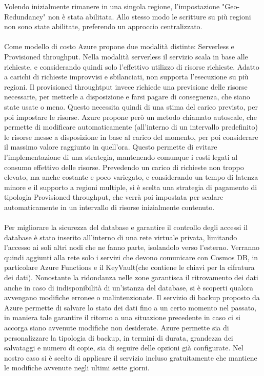 Volendo inizialmente rimanere in una singola regione,
l'impostazione "Geo-Redundancy" non è stata abilitata.
Allo stesso modo le scritture su più regioni non sono state abilitate,
preferendo un approccio centralizzato.\\
\\
Come modello di costo Azure propone due modalità distinte: Serverless e Provisioned throughput.
Nella modalità serverless il servizio scala in base alle richieste,
e considerando quindi solo l'effettivo utilizzo di risorse richieste.
Adatto a carichi di richieste improvvisi e sbilanciati,
non supporta l'esecuzione su più regioni.
Il provisioned throughtput invece richiede una previsione delle risorse necessarie,
per metterle a disposizione e farsi pagare di conseguenza, che siano state usate o meno.
Questo necessita quindi di una stima del carico previsto,
per poi impostare le risorse.
Azure propone però un metodo chiamato autoscale, 
che permette di modificare automaticamente (all'interno di un intervallo predefinito)
le risorse messe a disposizione in base al carico del momento,
per poi considerare il massimo valore raggiunto in quell'ora.
Questo permette di evitare l'implementazione di una strategia,
mantenendo comunque i costi legati al consumo effettivo delle risorse.
Prevedendo un carico di richieste non troppo elevato,
ma anche costante e poco variegato, 
e considerando un tempo di latenza minore e il supporto a regioni multiple,
si è scelta una strategia di pagamento di tipologia Provisioned throughput,
che verrà poi impostata per scalare automaticamente in un intervallo di risorse inizialmente contenuto.\\
\\
Per migliorare la sicurezza del database e garantire il controllo degli accessi
il database è stato inserito all'interno di una rete virtuale privata,
limitando l'accesso ai soli altri nodi che ne fanno parte,
isolandolo verso l'esterno.
Verranno quindi aggiunti alla rete solo i servizi che devono comunicare con Cosmos DB,
in particolare Azure Functions e il KeyVault(che contiene le chiavi per la cifratura dei dati).
Nonostante la ridondanza nelle zone garantisca il ritrovamento dei dati 
anche in caso di indisponibilità di un'istanza del database,
si è scoperti qualora avvengano modifiche erronee o malintenzionate.
Il servizio di backup proposto da Azure permette di salvare lo stato dei dati 
fino a un certo momento nel passato, 
in maniera tale garantire il ritorno a una situazione precedente 
in caso ci si accorga siano avvenute modifiche non desiderate. 
Azure permette sia di personalizzare la tipologia di backup,
in termini di durata, grandezza dei salvataggi e numero di copie,
sia di seguire delle opzioni già configurate.
Nel nostro caso si è scelto di applicare il servizio incluso gratuitamente
che mantiene le modifiche avvenute negli ultimi sette giorni.\\
\\


